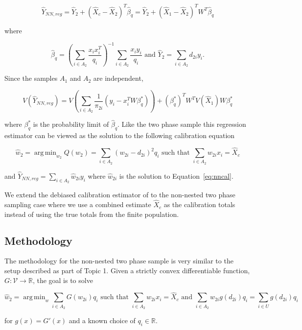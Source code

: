 \documentclass[12pt]{article}
\DeclareMathOperator*{\argmin}{arg\,min}
\begin{document}
$$
\hat Y_{NN, reg} = \hat Y_2 + (\hat X_c - \hat X_2)^T \hat \beta_q = 
\hat Y_2 + (\hat X_1 - \hat X_2)^T W^T\hat \beta_q 
$$

where %

$$\hat \beta_q = \left(\sum_{i \in A_2} \frac{x_i x_i^T}{q_i}\right)^{-1}
\sum_{i \in A_2} \frac{x_i y_i}{q_i} \text{ and }\hat Y_2 = \sum_{i \in A_2}
d_{2i} y_i. $$

Since the samples $A_1$ and $A_2$ are independent, 

$$V(\hat Y_{NN, reg}) = V\left(\sum_{i \in A_2} \frac{1}{\pi_{2i}}(y_i -
x_i^TW\beta^*_q)\right) + (\beta^*_q)^T W^T V(\hat X_1) W \beta_q^*$$

where $\beta_q^*$ is the probability limit of $\hat \beta_q$. Like the two phase
sample this regression estimator can be viewed as the solution to the following
calibration equation 

\begin{equation}\label{eq:nncal}
  \hat w_2 = \argmin_{w_2} Q(w_2) = \sum_{i \in A_2} (w_{2i} - d_{2i})^2 q_i 
  \text{ such that } \sum_{i \in A_2} w_{2i} x_i = \hat X_c
\end{equation}

and $\hat Y_{NN, reg} = \sum_{i \in A_2} \hat w_{2i} y_i$ where $\hat
w_{2i}$ is the solution to Equation~\ref{eq:nncal}.

We extend the debiased calibration estimator of \cite{kwon2024debiased} to the
non-nested two phase sampling case where we use a combined estimate $\hat X_c$
as the calibration totals instead of using the true totals from the finite
population.

\subsection{Methodology}

The methodology for the non-nested two phase sample is very similar to the setup
described as part of Topic 1. Given a strictly convex differentiable function,
$G: \mathcal{V} \to \mathbb{R}$, the goal is to solve

\begin{equation}\label{eq:nnopt}
\hat w_2 = \argmin_w \sum_{i \in A_2} G(w_{2i}) q_i \text{ such that } 
\sum_{i \in A_2} w_{2i} x_i = \hat X_{c} \text{ and } 
\sum_{i \in A_2} w_{2i} g(d_{2i}) q_i = \sum_{i \in U} g(d_{2i}) q_i
\end{equation}

for $g(x) = G'(x)$ and a known choice of $q_i \in \mathbb{R}$. 
\end{document}

